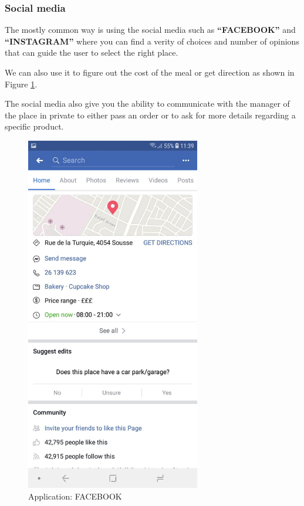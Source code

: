 \documentclass[12pt,a4paper]{report}
\begin{document}
	\subsubsection*{Social media}
	The mostly common way is using the social media such as \textbf{``FACEBOOK''} and \textbf{``INSTAGRAM''} where you can find a verity of choices and number of opinions that can guide the user to select the right place. \cite{articalefacebook}\par We can also use it to figure out the cost of the meal or get direction as shown in Figure \ref{label-facebook}.
	\par The social media also give you the ability to communicate with the manager of the place in private to either pass an order or to ask for more details regarding a specific product.  \par
	\begin{figure}[H]
		\centering
		\includegraphics[width=3in,keepaspectratio]{facebook.jpg}
		\caption{Application: FACEBOOK\protect{}\protect\footnotemark[\thefootnote]}
		
		\label{label-facebook}
	\end{figure}
	\clearpage
\end{document}
